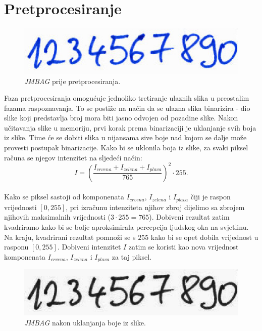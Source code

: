 \section{Pretprocesiranje}
\label{sec:pretprocesiranje}
\begin{figure}[htb]
    \centering
    \includegraphics[width=12cm]{images/preprocessing-original-image.png}
    \caption{\emph{JMBAG} prije pretprocesiranja.}
    \label{fig:preprocessing-original-image}
\end{figure}
Faza pretprocesiranja omogućuje jednoliko tretiranje ulaznih slika u preostalim fazama raspoznavanja. To se postiže na
način da se ulazna slika binarizira - dio slike koji predstavlja broj mora biti jasno odvojen od pozadine slike. Nakon
učitavanja slike u memoriju, prvi korak prema binarizaciji je uklanjanje svih boja iz slike. Time će se dobiti slika u
nijansama sive boje nad kojom se dalje može provesti postupak binarizacije. Kako bi se uklonila boja iz slike, za svaki
piksel računa se njegov intenzitet na sljedeći način:\\
\begin{equation*}
    I = \left(\frac{I_{crvena} + I_{zelena} + I_{plava}}{765}\right)^{2} \cdot 255.
\end{equation*}\\
Kako se piksel sastoji od komponenata $I_{crvena}$, $I_{zelena}$ i $I_{plava}$ čiji je raspon vrijednosti $[0, 255]$,
pri izračunu intenziteta njihov zbroj dijelimo sa zbrojem njihovih maksimalnih vrijednosti ($3 \cdot 255 = 765$).
Dobiveni rezultat zatim kvadriramo kako bi se bolje aproksimirala percepcija ljudskog oka na svjetlinu. Na kraju,
kvadrirani rezultat pomnoži se s $255$ kako bi se opet dobila vrijednost u rasponu $[0, 255]$. Dobiveni intenzitet $I$
zatim se koristi kao nova vrijednost komponenata $I_{crvena}$, $I_{zelena}$ i $I_{plava}$ za taj piksel.\\
\begin{figure}[htb]
    \centering
    \includegraphics[width=12cm]{images/preprocessing-grayscale-image.png}
    \caption{\emph{JMBAG} nakon uklanjanja boje iz slike.}
    \label{fig:preprocessing-grayscale-image}
\end{figure}
